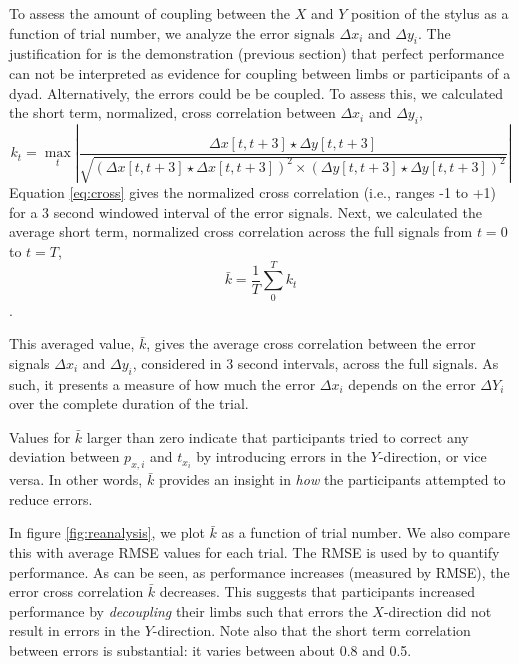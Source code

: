 \documentclass[11pt]{article}
\begin{document}
To assess the amount of coupling between the $X$ and $Y$ position of the stylus as a function of trial number, we analyze the error signals $\Delta x_i$ and $\Delta y_i$. The justification for is the demonstration (previous section) that perfect performance can not be interpreted as evidence for coupling between limbs or participants of a dyad. Alternatively, the errors could be be coupled. To assess this, we calculated the short term, normalized, cross correlation between $\Delta x_i$ and $\Delta y_i$,
%
\begin{equation}
k_t = \max_t | \frac{\Delta x [t,t+3] \star \Delta y [t,t+3] }{\sqrt{(\Delta x [t,t+3]  \star \Delta x [t,t+3] )^2 \times (\Delta y [t,t+3]  \star \Delta y [t,t+3] )^2} } |
\label{eq:cross}
\end{equation}
%
Equation \ref{eq:cross} gives the normalized cross correlation (i.e., ranges -1 to +1) for a 3 second windowed interval of the error signals. Next, we calculated the average short term, normalized cross correlation across the full signals from $t=0$ to $t=T$,
%
\begin{equation}
\bar{k} = \frac{1}{T} \sum_0^T k_t
\end{equation}.

This averaged value, $\bar{k}$, gives the average cross correlation between the error signals $\Delta x_i$ and $\Delta y_i$, considered in 3 second intervals, across the full signals. As such, it presents a measure of how much the error $\Delta x_i$ depends on the error $\Delta Y_i$ over the complete duration of the trial. 

Values for $\bar{k}$ larger than zero indicate that participants tried to correct any deviation between $p_{x,i}$ and $t_{x_i}$ by introducing errors in the $Y$-direction, or vice versa. In other words, $\bar{k}$ provides an insight in \textit{how} the participants attempted to reduce errors.

In figure \ref{fig:reanalysis}, we plot $\bar{k}$  as a function of trial number. We also compare this with average RMSE values for each trial. The RMSE is used by \citet{Annand2020} to quantify performance. As can be seen, as performance increases (measured by RMSE), the error cross correlation $\bar{k}$ decreases. This suggests that participants increased performance by \textit{decoupling} their limbs such that errors the $X$-direction did not result in errors in the $Y$-direction. Note also that the short term correlation between errors is substantial: it varies between about 0.8 and 0.5.
\end{document}
